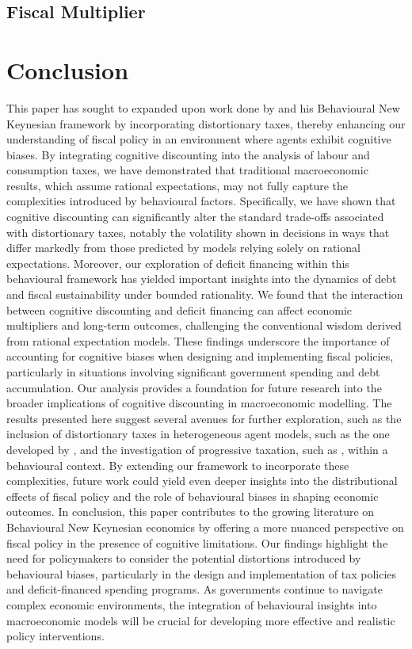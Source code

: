 \documentclass[11pt]{article}
\newcommand{\bb}{\bigbreak\noindent}
\begin{document}
\begin{spacing}{2}
\subsection{Fiscal Multiplier}





\section{Conclusion}
This paper has sought to expanded upon work done by \cite{gabaix2020behavioural} and his Behavioural New Keynesian framework by incorporating distortionary taxes, thereby enhancing our understanding of fiscal policy in an environment where agents exhibit cognitive biases. By integrating cognitive discounting into the analysis of labour and consumption taxes, we have demonstrated that traditional macroeconomic results, which assume rational expectations, may not fully capture the complexities introduced by behavioural factors. Specifically, we have shown that cognitive discounting can significantly alter the standard trade-offs associated with distortionary taxes, notably the volatility shown in  decisions in ways that differ markedly from those predicted by models relying solely on rational expectations.
\bb
Moreover, our exploration of deficit financing within this behavioural framework has yielded important insights into the dynamics of debt and fiscal sustainability under bounded rationality. We found that the interaction between cognitive discounting and deficit financing can affect economic multipliers and long-term outcomes, challenging the conventional wisdom derived from rational expectation models. These findings underscore the importance of accounting for cognitive biases when designing and implementing fiscal policies, particularly in situations involving significant government spending and debt accumulation.
\bb
Our analysis provides a foundation for future research into the broader implications of cognitive discounting in macroeconomic modelling. The results presented here suggest several avenues for further exploration, such as the inclusion of distortionary taxes in heterogeneous agent models,  such as the one developed by \cite{pfauti2022behavioral}, and the investigation of progressive taxation, such as \cite{ferriere2024heterogeneous}, within a behavioural context. By extending our framework to incorporate these complexities, future work could yield even deeper insights into the distributional effects of fiscal policy and the role of behavioural biases in shaping economic outcomes.
\bb
In conclusion, this paper contributes to the growing literature on Behavioural New Keynesian economics by offering a more nuanced perspective on fiscal policy in the presence of cognitive limitations. Our findings highlight the need for policymakers to consider the potential distortions introduced by behavioural biases, particularly in the design and implementation of tax policies and deficit-financed spending programs. As governments continue to navigate complex economic environments, the integration of behavioural insights into macroeconomic models will be crucial for developing more effective and realistic policy interventions.




\end{spacing}
\end{document}
